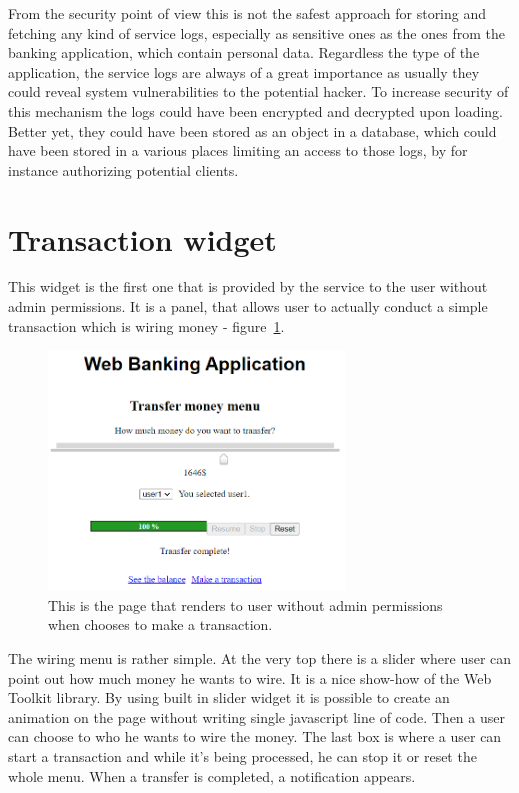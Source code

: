 \documentclass[a4paper,12pt]{book}
\begin{document}
{{\bigskip
From the security point of view this is not the safest approach for storing and fetching any kind of service logs, especially as sensitive ones as the ones from the banking application, which contain personal data. Regardless the type of the application, the service logs are always of a great importance as usually they could reveal system vulnerabilities to the potential hacker. To increase security of this mechanism the logs could have been encrypted and decrypted upon loading. Better yet, they could have been stored as an object in a database, which could have been stored in a various places limiting an access to those logs, by for instance authorizing potential clients. 
}

\section*{Transaction widget}
{
This widget is the first one that is provided by the service to the user without admin permissions. It is a panel, that allows user to actually conduct a simple transaction which is wiring money - figure~\ref{fig:transactionwid}.

\begin{figure}[H]
\centering
\includegraphics[width=0.7\textwidth]{wire}
\caption{This is the page that renders to user without admin permissions when chooses to make a transaction.}
\label{fig:transactionwid}
\end{figure}

The wiring menu is rather simple. At the very top there is a slider where user can point out how much money he wants to wire. It is a nice show-how of the Web Toolkit library. By using built in slider widget it is possible to create an animation on the page without writing single javascript line of code. Then a user can choose to who he wants to wire the money. The last box is where a user can start a transaction and while it's being processed, he can stop it or reset the whole menu. When a transfer is completed, a notification appears.

}}
\end{document}

